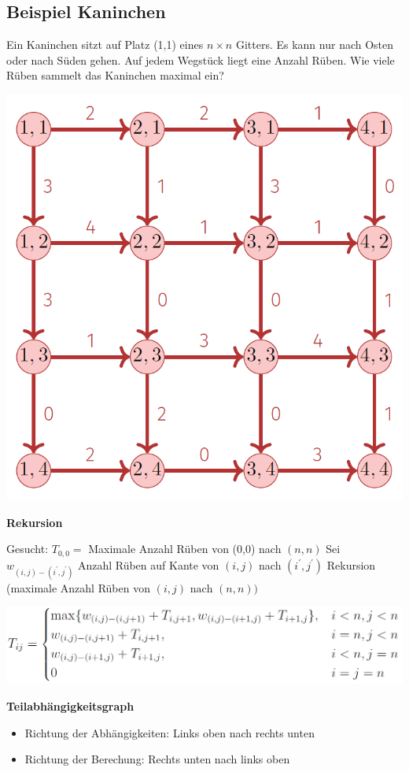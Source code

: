 \vspace{-4pt}
\begin{sectionbox}
\subsection{Beispiel Kaninchen}\smallskip
Ein Kaninchen sitzt auf Platz (1,1) eines $n \times n$ Gitters. Es kann nur nach Osten oder nach Süden gehen. Auf jedem Wegstück liegt eine Anzahl Rüben. Wie viele Rüben sammelt das Kaninchen maximal ein?\par\smallskip
\begin{center}
    \includegraphics[width = 0.75\columnwidth]{../img/kan1.png}
\end{center}\vspace{7px}
\end{sectionbox}
\vspace{-4pt}
\begin{sectionbox}
\textbf{Rekursion}\par
Gesucht: $T_{0,0}=$ Maximale Anzahl Rüben von (0,0) nach $(n, n)$ Sei $w_{(i, j)-\left(i^{\prime}, j^{\prime}\right)}$ Anzahl Rüben auf Kante von $(i, j)$ nach $\left(i^{\prime}, j^{\prime}\right)$ Rekursion (maximale Anzahl Rüben von $(i, j) \text { nach }(n, n))$\par\smallskip
\begin{center}
    \includegraphics[width = \columnwidth]{../img/kanRek.png}
\end{center}\vspace{7px}
\textbf{Teilabhängigkeitsgraph}\par
\begin{itemize}
    \item Richtung der Abhängigkeiten: Links oben nach rechts unten
    \item Richtung der Berechung: Rechts unten nach links oben
\end{itemize}\vspace{7px}

\end{sectionbox}
